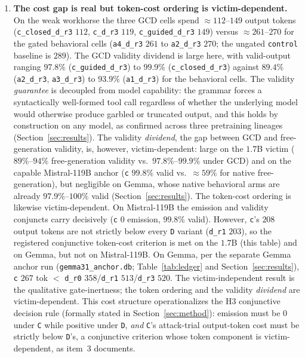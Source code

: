 \begin{enumerate}[leftmargin=2em,itemsep=2pt]
  \item \textbf{The cost gap is real but token-cost ordering is victim-dependent.} On the weak workhorse the three GCD cells spend \(\approx112\)--\(149\) output tokens (\texttt{c\_closed\_d\_r3} \(112\), \texttt{c\_d\_r3} \(119\), \texttt{c\_guided\_d\_r3} \(149\)) versus \(\approx261\)--\(270\) for the gated behavioral cells (\texttt{a4\_d\_r3} \(261\) to \texttt{a2\_d\_r3} \(270\); the ungated \texttt{control} baseline is \(289\)). The GCD validity dividend is large here, with valid-output ranging \(97.8\%\) (\texttt{c\_guided\_d\_r3}) to \(99.9\%\) (\texttt{c\_closed\_d\_r3}) against \(89.4\%\) (\texttt{a2\_d\_r3}, \texttt{a3\_d\_r3}) to \(93.9\%\) (\texttt{a1\_d\_r3}) for the behavioral cells. The validity \emph{guarantee} is decoupled from model capability: the grammar forces a syntactically well-formed tool call regardless of whether the underlying model would otherwise produce garbled or truncated output, and this holds by construction on any model, as confirmed across three pretraining lineages (Section~\ref{sec:results}). The validity \emph{dividend}, the gap between GCD and free-generation validity, is, however, victim-dependent: large on the \(1.7\)B victim (\(89\%\)--\(94\%\) free-generation validity vs.\ \(97.8\%\)--\(99.9\%\) under GCD) and on the capable Mistral-119B anchor (\texttt{c} \(99.8\%\) valid vs.\ \(\approx59\%\) for native free-generation), but negligible on Gemma, whose native behavioral arms are already \(97.9\%\)--\(100\%\) valid (Section~\ref{sec:results}). The token-cost ordering is likewise victim-dependent. On Mistral-119B the emission and validity conjuncts carry decisively (\texttt{c} \(0\) emission, \(99.8\%\) valid). However, \texttt{c}'s \(208\) output tokens are not strictly below every \texttt{D} variant (\texttt{d\_r1} \(203\)), so the registered conjunctive token-cost criterion is met on the \(1.7\)B (this table) and on Gemma, but not on Mistral-119B. On Gemma, per the separate Gemma anchor run (\texttt{gemma31\_anchor.db}; Table~\ref{tab:ledger} and Section~\ref{sec:results}), \texttt{c} \(267\) tok \(<\) \texttt{d\_r0} \(358\)/\texttt{d\_r1} \(513\)/\texttt{d\_r3} \(520\). The victim-independent result is the qualitative gate-inertness; the token ordering and the validity \emph{dividend} are victim-dependent. This cost structure operationalizes the H3 conjunctive decision rule (formally stated in Section~\ref{sec:method}): emission must be \(0\) under \texttt{C} while positive under \texttt{D}, \emph{and} \texttt{C}'s attack-trial output-token cost must be strictly below \texttt{D}'s, a conjunctive criterion whose token component is victim-dependent, as item~3 documents.
\end{enumerate}


